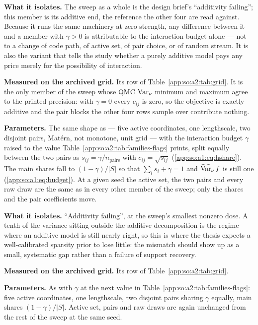 \textbf{What it isolates.} The sweep as a whole is the design brief's
``additivity failing''; this member is its additive end, the reference the
other four are read against. Because it runs the same machinery at zero
strength, any difference between it and a member with $\gamma>0$ is
attributable to the interaction budget alone --- not to a change of code path,
of active set, of pair choice, or of random stream. It is also the variant that
tells the study whether a purely additive model pays any price merely for the
possibility of interaction.

\textbf{Measured on the archived grid.} Its row of
Table~\ref{app:so:a2:tab:grid}. It is the only member of the sweep whose QMC
$\operatorname{\mathrm{Var}}_\nu$ minimum and maximum agree to the printed precision: with $\gamma=0$
every $c_{ij}$ is zero, so the objective is exactly additive and the pair
blocks the other four rows sample over contribute nothing.

\label{app:so:a2:interaction-g0-10}

\textbf{Parameters.} The same shape as  --- five
active coordinates, one lengthscale, two disjoint pairs, Mat\'ern, not
monotone, unit grid --- with the interaction budget $\gamma$ raised to the
value Table~\ref{app:so:a2:tab:families-flags} prints, split equally between the two
pairs as $s_{ij}=\gamma/n_{\text{pairs}}$ with $c_{ij}=\sqrt{s_{ij}}$
(\eqref{app:so:a1:eq:hshare}). The main shares fall to $(1-\gamma)/|S|$ so that
$\sum_i s_i+\gamma=1$ and $\operatorname{\widehat{\mathrm{Var}}}_\nu f$ is still one
(\eqref{app:so:a1:eq:budget}). At a given seed the active set, the two pairs
and every raw draw are the same as in every other member of the sweep; only the
shares and the pair coefficients move.

\textbf{What it isolates.} ``Additivity failing'', at the sweep's smallest
nonzero dose. A tenth of the variance sitting outside the additive
decomposition is the regime where an additive model is still nearly right, so
this is where the thesis expects a well-calibrated sparsity prior to lose
little: the mismatch should show up as a small, systematic gap rather than a
failure of support recovery.

\textbf{Measured on the archived grid.} Its row of
Table~\ref{app:so:a2:tab:grid}.

\label{app:so:a2:interaction-g0-25}

\textbf{Parameters.} As  with $\gamma$ at the next
value in Table~\ref{app:so:a2:tab:families-flags}: five active coordinates, one
lengthscale, two disjoint pairs sharing $\gamma$ equally, main shares
$(1-\gamma)/|S|$. Active set, pairs and raw draws are again unchanged from the
rest of the sweep at the same seed.

